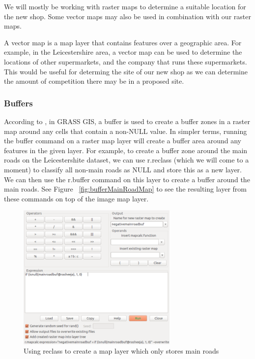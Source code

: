 \documentclass[a4paper,11pt,parskip]{scrartcl}
\begin{document}
We will mostly be working with raster maps to determine a suitable location for the new shop. Some vector
maps may also be used in combination with our raster maps.

A vector map is a map layer that contains features over a geographic area. For example,
in the Leicestershire area, a vector map can be used to determine the locations of other supermarkets, 
and the company that runs these supermarkets. This would be useful for determing the site of our new shop as we can determine the
amount of competition there may be in a proposed site. \parencite{manualVectorIntro}

\subsubsection{Buffers}

According to \textcite{manualBuffer}, in GRASS GIS, a buffer is used to create a buffer zones in a raster
map around any cells that contain a non-NULL value. In simpler terms, running the buffer command on a raster
map layer will create a buffer area around any features in the given layer. For example, to create a buffer 
zone around the main roads on the Leicestershite dataset, we can use r.reclass 
(which we will come to a moment) to classify all non-main roads as NULL and store this as a new layer. 
We can then use the r.buffer command on this layer to create a buffer around the main roads. 
See Figure ~\ref{fig:bufferMainRoadMap} to see the resulting layer from these commands on top of the image map layer.

\begin{figure}[H]
  \centering
  \includegraphics[width=0.7\textwidth]{pictures/reclassMainRoad.png}
  \caption{Using reclass to create a map layer which only stores main roads}
  \label{fig:reclassMainRoad}
\end{figure}
\end{document}
